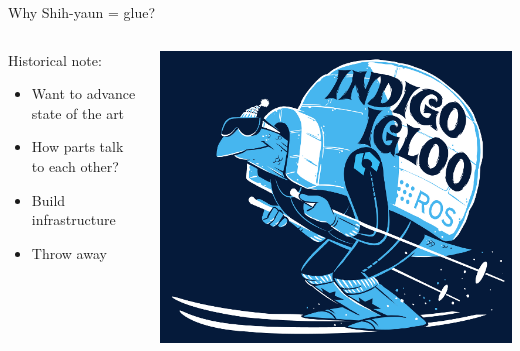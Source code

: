 \documentclass{beamer}
\begin{document}
\begin{frame}{Why Shih-yaun = glue?}
\begin{columns}
	\begin{column}{0.55\textwidth}
Historical note:
		\begin{itemize}
			\item Want to advance state of the art
                        \item How parts talk to each other?
                        \item Build infrastructure
			\item Throw away 
		\end{itemize} \end{column} \begin{column}{0.45\textwidth} \centering \includegraphics[width=\textwidth]{fig/indigoigloo_600.png} \end{column}
\end{columns}

\end{frame}
\end{document}
